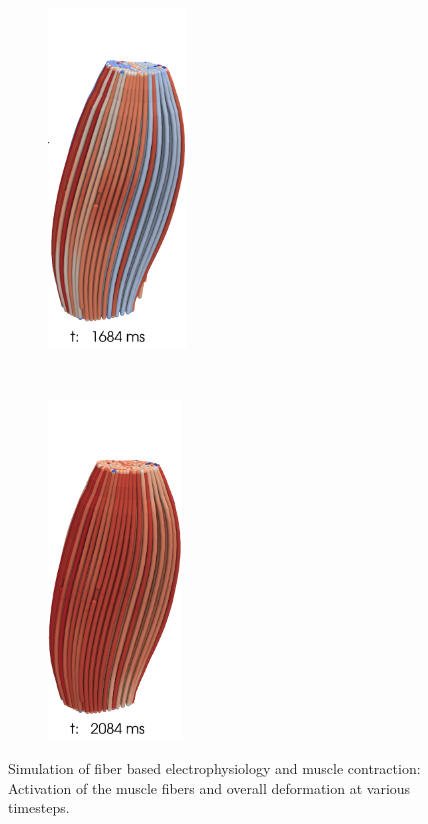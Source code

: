 \begin{figure}
\begin{subfigure}[t]{0.25\textwidth}
    \includegraphics[height=9cm]{images/results/application/contraction_fibers_1684b.png}%
    \caption{}%
    \label{fig:contraction_fibers_1684b}%
  \end{subfigure}\,
  \begin{subfigure}[t]{0.2\textwidth}%
    \centering%
    \includegraphics[height=9cm]{images/results/application/contraction_fibers_2084b.png}%
    \caption{}%
    \label{fig:contraction_fibers_2084b}%
  \end{subfigure}
  \caption{Simulation of fiber based electrophysiology and muscle contraction: Activation of the muscle fibers and overall deformation at various timesteps.}%
  \label{fig:contraction_fibers_1}%
\end{figure}%

